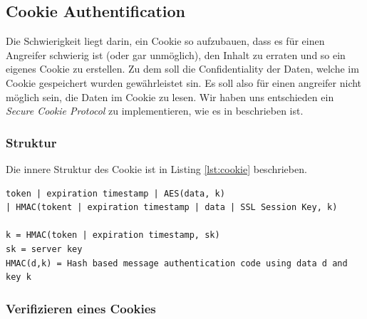 \subsection{Cookie Authentification}

Die Schwierigkeit liegt darin, ein Cookie so aufzubauen, dass es für einen Angreifer schwierig ist (oder gar unmöglich), den Inhalt zu
erraten und so ein eigenes Cookie zu erstellen. Zu dem soll die Confidentiality der Daten, welche im Cookie gespeichert wurden
gewährleistet sin. Es soll also für einen angreifer nicht möglich sein, die Daten im Cookie zu lesen. Wir haben uns entschieden
ein \textit{Secure Cookie Protocol} zu implementieren, wie es in \cite{securecookie} beschrieben ist.

\subsubsection{Struktur}

Die innere Struktur des Cookie ist in Listing \ref{lst:cookie} beschrieben.

\begin{lstlisting}[caption=Innere Struktur des Cookie,label={lst:cookie}]
token | expiration timestamp | AES(data, k) 
| HMAC(tokent | expiration timestamp | data | SSL Session Key, k)

k = HMAC(token | expiration timestamp, sk)
sk = server key
HMAC(d,k) = Hash based message authentication code using data d and key k
\end{lstlisting}

\subsubsection{Verifizieren eines Cookies}

